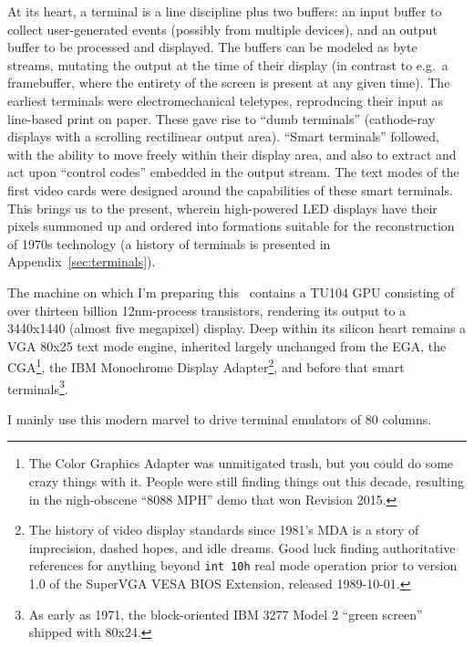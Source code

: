 \documentclass[letterpaper,10pt]{article}
\begin{document}
At its heart, a terminal is a line discipline plus two buffers: an input buffer
to collect user-generated events (possibly from multiple devices), and an
output buffer to be processed and displayed. The buffers can be modeled as byte
streams, mutating the output at the time of their display (in contrast to e.g.\
a framebuffer, where the entirety of the screen is present at any given time).
The earliest terminals were electromechanical teletypes, reproducing their
input as line-based print on paper. These gave rise to ``dumb terminals''
(cathode-ray displays with a scrolling rectilinear output area). ``Smart
terminals'' followed, with the ability to move freely within their display
area, and also to extract and act upon ``control codes'' embedded in the output
stream. The text modes of the first video cards were designed around the
capabilities of these smart terminals. This brings us to the present, wherein
high-powered LED displays have their pixels summoned up and ordered into
formations suitable for the reconstruction of 1970s technology (a history of
terminals is presented in Appendix~\ref{sec:terminals}).

The machine on which I'm preparing this \XeLaTeX\ contains a
TU104 GPU consisting of over thirteen billion 12nm-process transistors,
rendering its output to a 3440x1440 (almost five megapixel) display. Deep
within its silicon heart remains a VGA 80x25 text mode engine\cite{vga}, inherited
largely unchanged from the EGA, the CGA\footnote{The Color Graphics Adapter was
unmitigated trash, but you could do some crazy things with it. People were
still finding things out this decade\cite{cga1024}, resulting in the
nigh-obscene ``8088 MPH'' demo that won Revision 2015\cite{revision2015}.},
the IBM Monochrome Display Adapter\footnote{The
history of video display standards since 1981's MDA is a story of imprecision,
dashed hopes, and idle dreams. Good luck finding authoritative references
for anything beyond \texttt{int 10h} real mode operation prior to version 1.0
of the SuperVGA VESA BIOS Extension\cite{videostandards}, released 1989-10-01\cite{vesa}.},
and before that smart terminals\footnote{As early as 1971, the block-oriented
IBM 3277 Model 2 ``green screen'' shipped with 80x24.}.


I mainly use this modern marvel to drive terminal emulators of 80 columns.

\cleardoublepage
\end{document}
